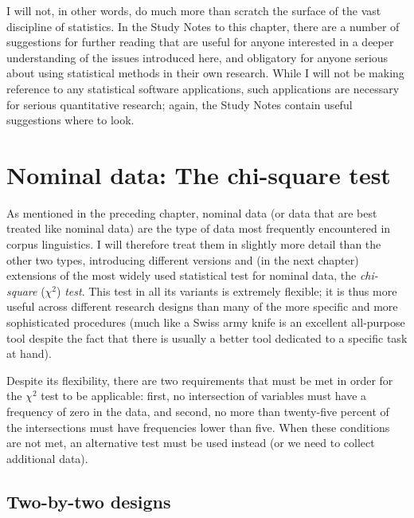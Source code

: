 I will not, in other words, do much more than scratch the surface of the vast discipline of statistics.  In the Study Notes to this chapter, there are a number of suggestions for further reading that are useful for anyone interested in a deeper understanding of the issues introduced here, and obligatory for anyone serious about using statistical methods in their own research. While I will not be making reference to any statistical software applications, such applications are necessary for serious quantitative  research; again, the Study Notes contain useful suggestions where to look.

\section{Nominal data: The chi\hyp{}square test}
\label{sec:chisquaretest}

As mentioned in the preceding chapter, nominal  data (or data that are best treated like nominal data) are the type of data most frequently encountered in corpus linguistics. I will therefore treat them in slightly more detail than the other two types, introducing different versions and (in the next chapter) extensions of the most widely used statistical test for nominal  data, the \textit{chi\hyp{}square}  ($\chi^2$) \textit{test}. This test in all its variants is extremely flexible; it is thus more useful across different research designs  than many of the more specific and more sophisticated procedures (much like a Swiss army knife is an excellent all\hyp{}purpose tool despite the fact that there is usually a better tool dedicated to a specific task at hand).

Despite its flexibility, there are two requirements that must be met in order for the $\chi^2$  test to be applicable: first, no intersection of variables must have a frequency  of zero in the data, and second, no more than twenty\hyp{}five percent of the intersections must have frequencies lower than five. When these conditions are not met, an alternative test must be used instead (or we need to collect additional data).

\subsection{Two\hyp{}by\hyp{}two designs}
\label{sec:chisquaretwobytwo}

